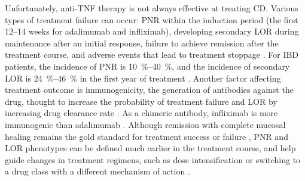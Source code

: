 Unfortunately, anti-\gls{TNF} therapy is not always effective at treating \gls{CD}.
Various types of treatment failure can occur:
\gls{PNR} within the induction period (the first \numrange{12}{14} weeks for adalimumab and infliximab), developing secondary \gls{LOR} during maintenance after an initial response, failure to achieve remission after the treatment course, and adverse events that lead to treatment stoppage \autocite{roda2016LossResponseAntiTNFs}.
For \gls{IBD} patients, the incidence of \gls{PNR} is \SIrange{10}{40}{\percent}, and the incidence of secondary \gls{LOR} is \SIrange{24}{46}{\percent} in the first year of treatment \autocite{ben-horin2014OptimizingAntiTNFTreatments,flamant2018InflammatoryBowelDisease,kennedy2019PredictorsAntiTNFTreatment}.
Another factor affecting treatment outcome is immunogenicity, the generation of antibodies against the drug, 
thought to increase the probability of treatment failure and \gls{LOR} by increasing drug clearance rate \autocite{lichtenstein2013ComprehensiveReviewAntitumor,kennedy2019PredictorsAntiTNFTreatment}.
As a chimeric antibody, infliximab is more immunogenic than adalimumab \autocite{vermeire2018ImmunogenicityBiologicsInflammatory,kennedy2019PredictorsAntiTNFTreatment}.
Although remission with complete mucosal healing remains the gold standard for treatment success or failure \autocite{roda2020CrohnDisease}, 
\gls{PNR} and \gls{LOR} phenotypes can be defined much earlier in the treatment course, 
and help guide changes in treatment regimens,
such as dose intensification or switching to a drug class with a different mechanism of action \autocite{lichtenstein2013ComprehensiveReviewAntitumor,ben-horin2014OptimizingAntiTNFTreatments}.

